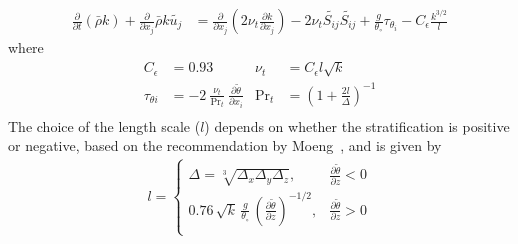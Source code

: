 \begin{align}
  \frac{\partial}{\partial t}\left(\bar{\rho} k \right) + \frac{\partial}{\partial x_j} \bar{\rho} k \widetilde{u_j} &= \frac{\partial}{\partial x_j} \left (2 \nu_t \frac{\partial k}{\partial x_j} \right) - 2 \nu_t \widetilde{S_{ij}} \widetilde{S_{ij}} + \frac{g}{\theta_\circ} \tau_{\theta_i} - C_{\epsilon} \frac{k^{3/2}}{l} \label{eqn:ksgs-les}
\end{align}
where
\begin{align*}
  C_\epsilon &= 0.93 & \nu_t &= C_\epsilon l \sqrt{k} \\
  \tau_{\theta i} &= - 2\ \frac{\nu_t}{\mathrm{Pr}_t}\ \frac{\partial \widetilde{\theta}}{\partial x_i} & \mathrm{Pr}_t &= \left( 1 + \frac{2l}{\Delta} \right)^{-1} \\
\end{align*}
The choice of the length scale ($l$) depends on whether the stratification is positive
or negative, based on the recommendation by Moeng~\cite{Moeng1984}, and is given
by
\begin{align*}
  l =
  \begin{cases}
    \Delta = \sqrt[3]{\Delta_x \Delta_y \Delta_z}, & \frac{\partial \widetilde{\theta}}{\partial z} < 0 \\
    0.76\, \sqrt{k}\, \frac{g}{\theta_\circ}\, \left( \frac{\partial \widetilde{\theta}}{\partial z}\right)^{-1/2}, &  \frac{\partial \widetilde{\theta}}{\partial z} > 0 \\
  \end{cases}
\end{align*}

\begin{comment}
  \fxnote{Shreyas write this part.  Currently placeholder equations below.}\\

  The low-Mach number equations:
  \begin{align}
    \frac{\partial \rho} {\partial t} + \frac{\partial \rho u_j}{\partial x_j} & = 0, \\
    \frac{\partial \rho u_i}{\partial t} + \frac{\partial \rho u_j u_i}{\partial x_j}
    + \frac{\partial P}{\partial x_i} & = \frac{\partial \tau_{ij}}{\partial x_j}
                                        + \left( \rho - \rho_{\circ} \right) g_i, \\
    \frac{\partial \rho h}{\partial t} + \frac{\partial \rho u_j h}{\partial x_j} & =
                                                                                    - \frac{\partial q_j}{\partial x_j} + \frac{\partial P_{th}}{\partial t},
  \end{align}
\end{comment}


